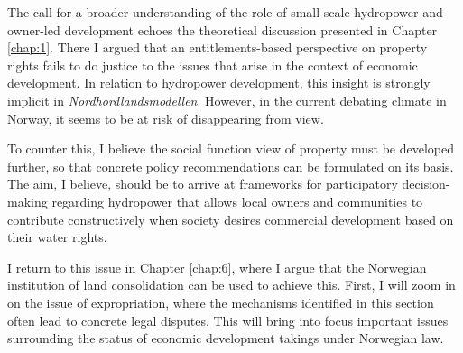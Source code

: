 The call for a broader understanding of the role of small-scale hydropower and owner-led development echoes the theoretical discussion presented in Chapter \ref{chap:1}. There I argued that an entitlements-based perspective on property rights fails to do justice to the issues that arise in the context of economic development. In relation to hydropower development, this insight is strongly implicit in {\it Nordhordlandsmodellen}. However, in the current debating climate in Norway, it seems to be at risk of disappearing from view.

To counter this, I believe the social function view of property must be developed further, so that concrete policy recommendations can be formulated on its basis. The aim, I believe, should be to arrive at frameworks for participatory decision-making regarding hydropower that allows local owners and communities to contribute constructively when society desires commercial development based on  their water rights.

I return to this issue in Chapter \ref{chap:6}, where I argue that the Norwegian institution of land consolidation can be used to achieve this. First, I will zoom in on the issue of expropriation, where the mechanisms identified in this section often lead to concrete legal disputes. This will bring into focus important issues surrounding the status of economic development takings under Norwegian law.

